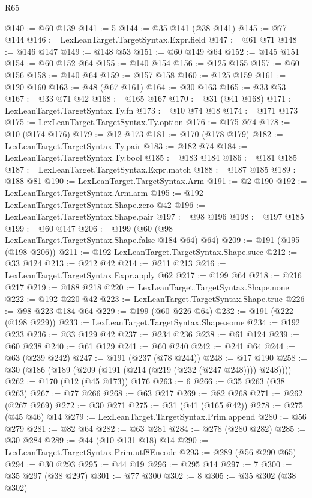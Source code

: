 \begin{lexlean}{R65}
\begin{coremodule}
@140 := @60 @139
@141 := 5
@144 := @35 @141 (@38 @141)
@145 := @77 @144
@146 := LexLeanTarget.TargetSyntax.Expr.field
@147 := @61 @71
@148 := @146 @147
@149 := @148 @53
@151 := @60 @149 @64
@152 := @145 @151
@154 := @60 @152 @64
@155 := @140 @154
@156 := @125 @155
@157 := @60 @156
@158 := @140 @64
@159 := @157 @158
@160 := @125 @159
@161 := @120 @160
@163 := @48 (@67 @161)
@164 := @30 @163
@165 := @33 @53
@167 := @33 @71 @42
@168 := @165 @167
@170 := @31 (@41 @168)
@171 := LexLeanTarget.TargetSyntax.Ty.fn
@173 := @10 @74 @18
@174 := @171 @173
@175 := LexLeanTarget.TargetSyntax.Ty.option
@176 := @175 @74
@178 := @10 (@174 @176)
@179 := @12 @173
@181 := @170 (@178 @179)
@182 := LexLeanTarget.TargetSyntax.Ty.pair
@183 := @182 @74
@184 := LexLeanTarget.TargetSyntax.Ty.bool
@185 := @183 @184
@186 := @181 @185
@187 := LexLeanTarget.TargetSyntax.Expr.match
@188 := @187 @185
@189 := @188 @81
@190 := LexLeanTarget.TargetSyntax.Arm
@191 := @2 @190
@192 := LexLeanTarget.TargetSyntax.Arm.arm
@195 := @192 LexLeanTarget.TargetSyntax.Shape.zero @42
@196 := LexLeanTarget.TargetSyntax.Shape.pair
@197 := @98 @196
@198 := @197 @185
@199 := @60 @147
@206 := @199 (@60 (@98 LexLeanTarget.TargetSyntax.Shape.false @184 @64) @64)
@209 := @191 (@195 (@198 @206))
@211 := @192 LexLeanTarget.TargetSyntax.Shape.succ
@212 := @33 @124
@213 := @212 @42
@214 := @211 @213
@216 := LexLeanTarget.TargetSyntax.Expr.apply @62
@217 := @199 @64
@218 := @216 @217
@219 := @188 @218
@220 := LexLeanTarget.TargetSyntax.Shape.none
@222 := @192 @220 @42
@223 := LexLeanTarget.TargetSyntax.Shape.true
@226 := @98 @223 @184 @64
@229 := @199 (@60 @226 @64)
@232 := @191 (@222 (@198 @229))
@233 := LexLeanTarget.TargetSyntax.Shape.some
@234 := @192 @233
@236 := @33 @129 @42
@237 := @234 @236
@238 := @61 @124
@239 := @60 @238
@240 := @61 @129
@241 := @60 @240
@242 := @241 @64
@244 := @63 (@239 @242)
@247 := @191 (@237 (@78 @244))
@248 := @17 @190
@258 := @30 (@186 (@189 (@209 (@191 (@214 (@219 (@232 (@247 @248)))) @248))))
@262 := @170 (@12 (@45 @173)) @176
@263 := 6
@266 := @35 @263 (@38 @263)
@267 := @77 @266
@268 := @63 @217
@269 := @82 @268
@271 := @262 (@267 @269)
@272 := @30 @271
@275 := @31 (@41 (@165 @42))
@278 := @275 (@45 @46) @14
@279 := LexLeanTarget.TargetSyntax.Prim.append
@280 := @56 @279
@281 := @82 @64
@282 := @63 @281
@284 := @278 (@280 @282)
@285 := @30 @284
@289 := @44 (@10 @131 @18) @14
@290 := LexLeanTarget.TargetSyntax.Prim.utf8Encode
@293 := @289 (@56 @290 @65)
@294 := @30 @293
@295 := @44 @19
@296 := @295 @14
@297 := 7
@300 := @35 @297 (@38 @297)
@301 := @77 @300
@302 := 8
@305 := @35 @302 (@38 @302)

\end{coremodule}
\end{lexlean}

